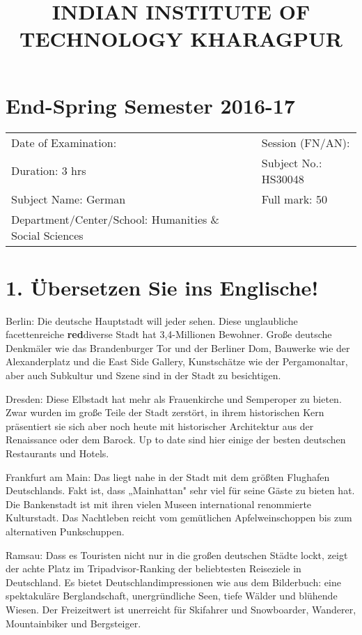 \documentclass[12pt]{article}
\title{
INDIAN INSTITUTE OF TECHNOLOGY KHARAGPUR
}
\begin{document}
\maketitle

\section*{End-Spring Semester 2016-17}

\begin{tabular}{ll}
Date of Examination: \underline{\hspace{4cm}} & Session (FN/AN): \underline{\hspace{2cm}} \\
Duration: 3 hrs & Subject No.: HS30048 \\
Subject Name: German & Full mark: 50 \\
Department/Center/School: Humanities \& Social Sciences &
\end{tabular}

\vspace{1em}

\section*{1. Übersetzen Sie ins Englische!}

Berlin: Die deutsche Hauptstadt will jeder sehen. Diese unglaubliche facettenreiche \textbf{red}{diverse} Stadt hat 3,4-Millionen Bewohner. Große deutsche Denkmäler wie das Brandenburger Tor und der Berliner Dom, Bauwerke wie der Alexanderplatz und die East Side Gallery, Kunstschätze wie der Pergamonaltar, aber auch Subkultur und Szene sind in der Stadt zu besichtigen.

Dresden: Diese Elbstadt hat mehr als Frauenkirche und Semperoper zu bieten. Zwar wurden im große Teile der Stadt zerstört, in ihrem historischen Kern präsentiert sie sich aber noch heute mit historischer Architektur aus der Renaissance oder dem Barock. Up to date sind hier einige der besten deutschen Restaurants und Hotels.

Frankfurt am Main: Das liegt nahe in der Stadt mit dem größten Flughafen Deutschlands. Fakt ist, dass „Mainhattan" sehr viel für seine Gäste zu bieten hat. Die Bankenstadt ist mit ihren vielen Museen international renommierte Kulturstadt. Das Nachtleben reicht vom gemütlichen Apfelweinschoppen bis zum alternativen Punkschuppen.

Ramsau: Dass es Touristen nicht nur in die großen deutschen Städte lockt, zeigt der achte Platz im Tripadvisor-Ranking der beliebtesten Reiseziele in Deutschland. Es bietet Deutschlandimpressionen wie aus dem Bilderbuch: eine spektakuläre Berglandschaft, unergründliche Seen, tiefe Wälder und blühende Wiesen. Der Freizeitwert ist unerreicht für Skifahrer und Snowboarder, Wanderer, Mountainbiker und Bergsteiger.
 
\end{document}
